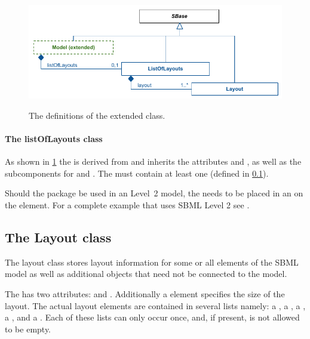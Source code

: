 \begin{figure}[!ht]
\includegraphics{uml/layout-extended-model-uml}\\
\caption{The definitions of the extended \Model class.}
\label{figure:extendedmodel}
\end{figure}

\paragraph{The listOfLayouts class}
\label{listoflayouts-class}
As shown in \ref{figure:extendedmodel} the \ListOfLayouts is derived from 
\SBase and inherits the attributes  and , 
as well as the subcomponents for \Annotation and \Notes. The 
\ListOfLayouts must contain at least one \Layout (defined in 
\ref{layout-class}). 

Should the \Layout package be used in an \SBML Level~2 model, the 
\ListOfLayouts needs to be placed in an \Annotation on the \Model element. 
For a complete example that uses SBML Level 2 see .

\subsection{The Layout class}
\label{layout-class}
The layout class stores layout information for some or all elements of 
the SBML model as well as additional objects that need not be connected 
to the model. 

The \LayoutClass has two attributes:  and 
. Additionally a \Dimensions element specifies the size of 
the layout. The actual layout elements are contained in several lists 
namely: a \ListOfCompartmentGlyphs, a \ListOfSpeciesGlyphs, a 
\ListOfReactionGlyphs, a \ListOfTextGlyphs, and a 
\ListOfAdditionalGraphicalObjects. Each of these lists can only occur 
once, and, if present, is not allowed to be empty. 


